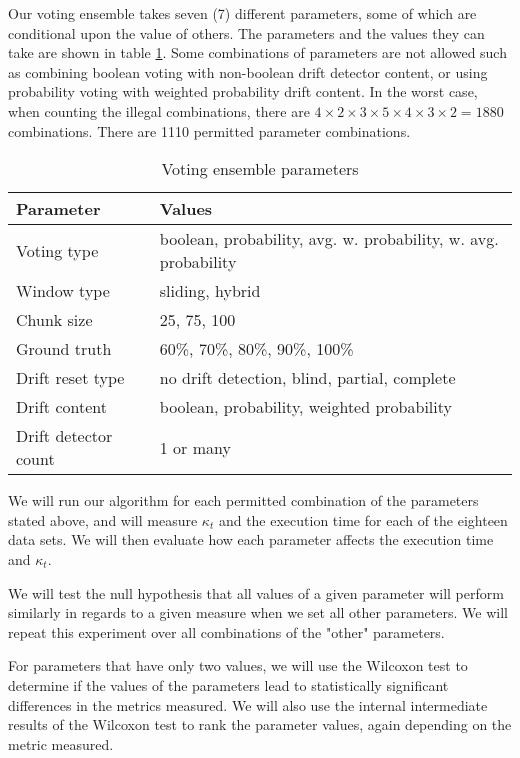 Our voting ensemble takes seven (7) different parameters, some of which are conditional upon the value of others. The parameters and the values they can take are shown in table \ref{table:ensemble_params}. Some combinations of parameters are not allowed such as combining boolean voting with non-boolean drift detector content, or using probability voting with weighted probability drift content. In the worst case, when counting the illegal combinations, there are $4\times2\times3\times5\times4\times3\times2=1880$ combinations. There are 1110 permitted parameter combinations.

\begin{table}[]
\caption{Voting ensemble parameters\label{table:ensemble_params}}
\begin{tabular}{|l|l|}
\hline
\textbf{Parameter} & \textbf{Values} \\ \hline \hhline{==}
Voting type & boolean, probability, avg. w. probability, w. avg. probability \\ \hline
Window type & sliding, hybrid \\ \hline
Chunk size & 25, 75, 100 \\ \hline
Ground truth & 60\%, 70\%, 80\%, 90\%, 100\% \\ \hline
Drift reset type & no drift detection, blind, partial, complete \\ \hline
Drift content & boolean, probability, weighted probability \\ \hline
Drift detector count & 1 or many \\ \hline
\end{tabular}
\end{table}

We will run our algorithm for each permitted combination of the parameters stated above, and will measure  $\kappa_t$ and the execution time for each of the eighteen data sets. We will then evaluate how each parameter affects the execution time and $\kappa_t$.

We will test the null hypothesis that all values of a given parameter will perform similarly in regards to a given measure when we set all other parameters. We will repeat this experiment over all combinations of the "other" parameters.

For parameters that have only two values, we will use the Wilcoxon test to determine if the values of the parameters lead to statistically significant differences in the metrics measured. We will also use the internal intermediate results of the Wilcoxon test to rank the parameter values, again depending on the metric measured.

